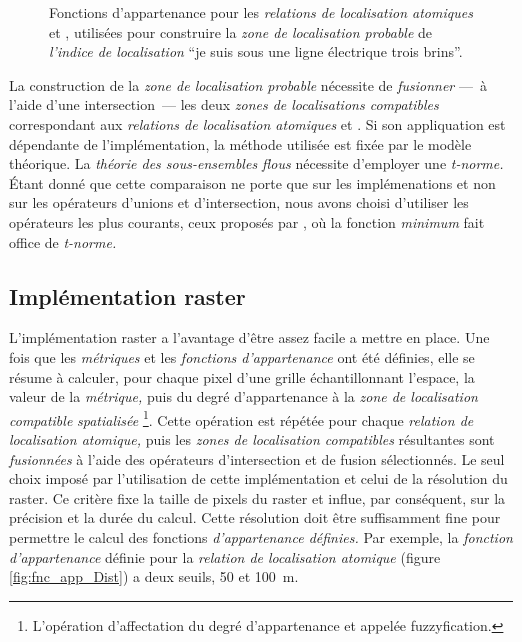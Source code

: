 \begin{figure}
  \centering \subfloat[]{%
    
    \label{fig:fnc_app_Dist}
  }
  \hfill%
  \subfloat[]{%
    
    \label{fig:fnc_app_AltInf}
  }
  \caption{Fonctions d'appartenance pour les \emph{relations de
      localisation atomiques}
    \protect{}
    \protect{} et
    \protect{}
    \protect{}, utilisées pour construire la
    \emph{zone de localisation probable} de \emph{l'indice de
      localisation} \enquote{je suis sous une ligne électrique trois
      brins}.}
  \label{fig:fnc_app_sousProche}
\end{figure}

La construction de la \emph{zone de localisation probable} nécessite
de \emph{fusionner} ---~à l'aide d'une intersection~--- les deux
\emph{zones de localisations compatibles} correspondant aux
\emph{relations de localisation atomiques}
 et
. Si son appliquation est dépendante de
l'implémentation, la méthode utilisée est fixée par le modèle
théorique. La \emph{théorie des sous-ensembles flous} nécessite
d'employer une \emph{t-norme.} Étant donné que cette comparaison ne
porte que sur les implémenations et non sur les opérateurs d'unions et
d'intersection, nous avons choisi d'utiliser les opérateurs les plus
courants, ceux proposés par \textcite{Zadeh1965}, où la fonction
\emph{minimum} fait office de \emph{t-norme.}

\subsection{Implémentation raster}

L'implémentation raster a l'avantage d'être assez facile a mettre en
place. Une fois que les \emph{métriques} et les \emph{fonctions
  d’appartenance} ont été définies, elle se résume à calculer, pour
chaque pixel d'une grille échantillonnant l'espace, la valeur de la
\emph{métrique,} puis du degré d'appartenance à la \emph{zone de
  localisation compatible} \emph{spatialisée} \footnote{L'opération
  d'affectation du degré d'appartenance et appelée
  fuzzyfication.}. Cette opération est répétée pour chaque
\emph{relation de localisation atomique,} puis les \emph{zones de
  localisation compatibles} résultantes sont \emph{fusionnées} à
l'aide des opérateurs d'intersection et de fusion sélectionnés. Le
seul choix imposé par l'utilisation de cette implémentation et celui
de la résolution du raster. Ce critère fixe la taille de pixels du
raster et influe, par conséquent, sur la précision et la durée du
calcul. Cette résolution doit être suffisamment fine pour permettre le
calcul des fonctions \emph{d'appartenance définies.} Par exemple, la
\emph{fonction d'appartenance} définie pour la \emph{relation de
  localisation atomique}  (figure
\ref{fig:fnc_app_Dist}) a deux seuils, \num{50} et \SI{100}{\meter}.

